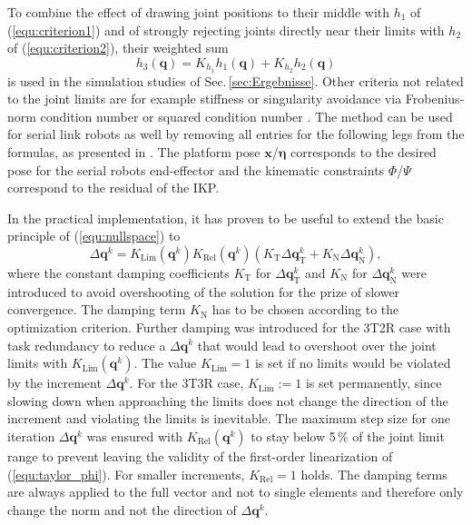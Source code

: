 \documentclass[robotics,article,submit,moreauthors,pdftex]{Definitions/mdpi}
\newcommand{\bm}[1]{\boldsymbol{#1}}
\let\Phi\varPhi
\let\Psi\varPsi
\begin{document}
To combine the effect of drawing joint positions to their middle with $h_1$ of (\ref{equ:criterion1}) and of strongly rejecting joints directly near their limits with $h_2$ of (\ref{equ:criterion2}), their weighted sum
%
\begin{equation}
h_3(\bm{q})
=
K_{h_1} h_1(\bm{q}) + K_{h_2} h_2(\bm{q})
\label{equ:criterion3}
\end{equation}
%
is used in the simulation studies of Sec.\,\ref{sec:Ergebnisse}.
%
Other criteria not related to the joint limits are for example stiffness \cite{GuoDonKe2015} or singularity avoidance via Frobenius-norm condition number \cite{ZhuQuCaoYan2013} or squared condition number \cite{LegerAng2016}.
The method can be used for serial link robots as well by removing all entries for the following legs from the formulas, as presented in \cite{1_SchapplerTapOrt2019}.
The platform pose $\bm{x}$/$\bm{\eta}$ corresponds to the desired pose for the serial robots end-effector and the kinematic constraints $\bm{\Phi}$/$\bm{\Psi}$ correspond to the residual of the IKP.

In the practical implementation, it has proven to be useful to extend the basic principle of (\ref{equ:nullspace}) to
%
\begin{equation}
{\Delta}\bm{q}^k
=
K_\mathrm{Lim}(\bm{q}^k) K_\mathrm{Rel}(\bm{q}^k) (K_\mathrm{T} {\Delta}\bm{q}_{\mathrm{T}}^k + K_\mathrm{N} {\Delta}\bm{q}_{\mathrm{N}}^k),
\label{equ:IK_damping}
\end{equation}
%
where the constant damping coefficients $K_\mathrm{T}$ for ${\Delta}\bm{q}_{\mathrm{T}}^k$ and $K_\mathrm{N}$ for ${\Delta}\bm{q}_{\mathrm{N}}^k$ were introduced to avoid overshooting of the solution for the prize of slower convergence.
The damping term $K_\mathrm{N}$ has to be chosen according to the optimization criterion.
Further damping was introduced for the 3T2R case with task redundancy to reduce a ${\Delta}\bm{q}^{k}$ that would lead to overshoot over the joint limits with $K_\mathrm{Lim}(\bm{q}^k)$. %
The value $K_\mathrm{Lim}=1$ is set if no limits would be violated by the increment ${\Delta}\bm{q}^k$.
For the 3T3R case, $K_\mathrm{Lim}:=1$ is set permanently, since slowing down when approaching the limits does not change the direction of the increment and violating the limits is inevitable.
The maximum step size for one iteration $\Delta\bm{q}^k$ was ensured with $K_\mathrm{Rel}(\bm{q}^k)$ to stay below 5\,\% of the joint limit range to prevent leaving the validity of the first-order linearization of (\ref{equ:taylor_phi}).
For smaller increments, $K_\mathrm{Rel}=1$ holds.
The damping terms are always applied to the full vector and not to single elements and therefore only change the norm and not the direction of ${\Delta}\bm{q}^k$.
\end{document}
